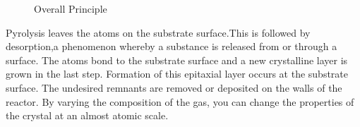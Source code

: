\begin{flushleft}
\begin{figure}[h!]
	\caption{Overall Principle}
	\label{fig:img4} 
\end{figure}
\vspace{3mm}
\newline 
Pyrolysis leaves the atoms on the substrate surface.This is followed by desorption,a phenomenon whereby a substance is released from or through a surface.
\vspace{3mm}\newline
The atoms bond to the substrate surface and a new crystalline layer is grown in the last step. Formation of this epitaxial layer occurs at the substrate surface.
\vspace{3mm}
\newline
The undesired remnants are removed or deposited on the walls of the reactor.\newline
By varying the composition of the gas, you can change the properties of the crystal at an almost atomic scale.
\vspace{1mm}

\end{flushleft}
